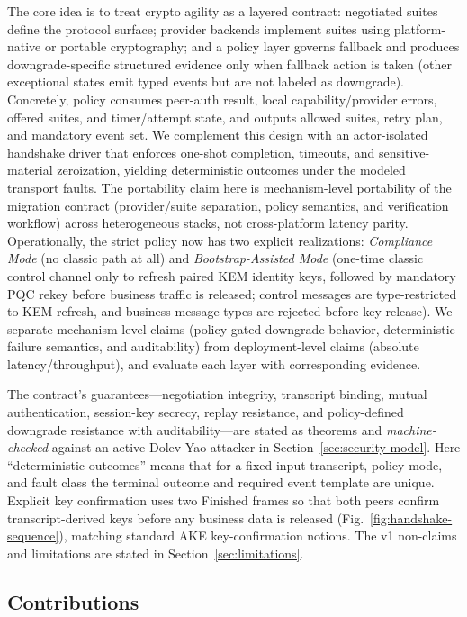 \documentclass[10pt,journal,compsoc]{IEEEtran}
\begin{document}
The core
idea is to treat crypto agility as a layered
contract: negotiated suites define the protocol surface; provider
backends implement suites using platform-native or portable
cryptography; and a policy layer governs fallback and produces
downgrade-specific structured evidence only when fallback action is
taken (other exceptional states emit typed events but are not labeled
as downgrade). Concretely, policy consumes peer-auth result, local
capability/provider errors, offered suites, and timer/attempt state, and
outputs allowed suites, retry plan, and mandatory event set. We
complement
this design with an actor-isolated handshake driver that enforces
one-shot completion, timeouts, and sensitive-material zeroization,
yielding deterministic outcomes under the modeled transport faults.
The portability claim here is mechanism-level portability of the
migration contract (provider/suite separation, policy semantics, and
verification workflow) across heterogeneous stacks, not cross-platform
latency parity.
Operationally, the strict policy now has two explicit realizations:
\emph{Compliance Mode} (no classic path at all) and
\emph{Bootstrap-Assisted Mode} (one-time classic control channel only to
refresh paired KEM identity keys, followed by mandatory PQC rekey before
business traffic is released; control messages are type-restricted to
KEM-refresh, and business message types are rejected before key
release).
We separate mechanism-level claims (policy-gated downgrade behavior,
deterministic failure semantics, and auditability) from deployment-level
claims (absolute latency/throughput), and evaluate each layer with
corresponding evidence.

The contract's guarantees---negotiation integrity, transcript binding,
mutual authentication, session-key secrecy, replay resistance, and
policy-defined downgrade resistance with auditability---are stated as
theorems and \emph{machine-checked} against an active Dolev-Yao attacker
in Section~\ref{sec:security-model}. Here ``deterministic outcomes''
means that for a fixed input transcript, policy mode, and fault class
the terminal outcome and required event template are unique. Explicit
key confirmation uses two Finished frames so that both peers confirm
transcript-derived keys before any business data is released
(Fig.~\ref{fig:handshake-sequence}), matching standard AKE
key-confirmation notions. The v1 non-claims and limitations are stated
in Section~\ref{sec:limitations}.

\subsection{Contributions}\label{a.-contributions}
\end{document}
